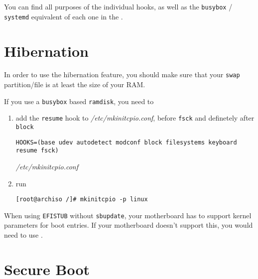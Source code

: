 \documentclass[10pt]{dustdoc}
\begin{document}
\begin{NOTE}
    You can find all purposes of the individual hooks, as well as the \texttt{busybox} / \texttt{systemd} equivalent of each one in the .
\end{NOTE}

\section{Hibernation}
\label{sec:hibernation}

In order to use the hibernation feature, you should make sure that your \texttt{swap} partition/file is at least the size of your RAM.

\begin{NOTE}
    If you use a \texttt{busybox} based \texttt{ramdisk}, you need to

    \begin{enumerate}
        \item add the \texttt{resume} hook to \textit{/etc/mkinitcpio.conf}, before \texttt{fsck} and definetely after \texttt{block}

            \begin{mintedlisting}
                \begin{verbatim}
HOOKS=(base udev autodetect modconf block filesystems keyboard resume fsck)
                \end{verbatim}

                \caption{\textit{/etc/mkinitcpio.conf}}
            \end{mintedlisting}
        \item run

            \begin{verbatim}
[root@archiso /]# mkinitcpio -p linux
            \end{verbatim}
    \end{enumerate}
\end{NOTE}

\begin{NOTE}
    When using \texttt{EFISTUB} without \texttt{sbupdate}, your motherboard has to support kernel parameters for boot entries.
    If your motherboard doesn’t support this, you would need to use .
\end{NOTE}

\section{Secure Boot}
\label{sec:secure-boot}
\end{document}
